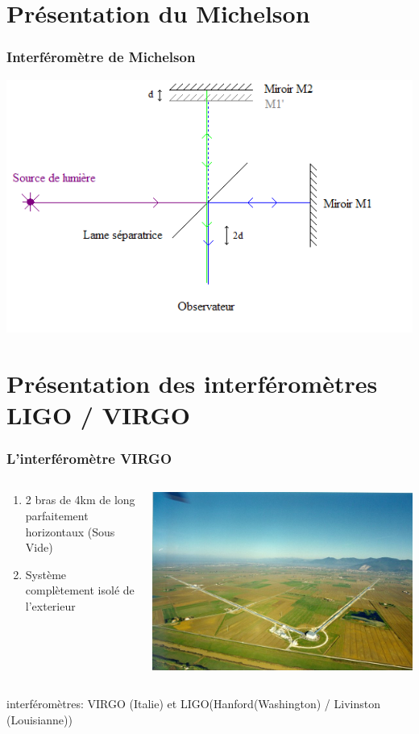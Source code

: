 \documentclass{beamer}
\begin{document}
\section{Présentation du Michelson}

\begin{frame}
	\frametitle{Interféromètre de Michelson}
	\includegraphics[scale=0.5]{Docs/interferometre_michelson.png}
\end{frame}


\section{Présentation des interféromètres LIGO / VIRGO}
\begin{frame}
	\frametitle{L'interféromètre VIRGO}
	\begin{columns}
		\begin{column}{0.5\textwidth}
			\small
			\begin{enumerate}[-]
				\item 2 bras de 4km de long parfaitement horizontaux (Sous Vide)
				\item Système complètement isolé de l'exterieur
			\end{enumerate}
		\end{column}
		\begin{column}{0.5\textwidth}
			\includegraphics[scale=.5]{Docs/virgoview.png}
		\end{column}
	\end{columns}
	 interféromètres: VIRGO (Italie) et LIGO(Hanford(Washington) / Livinston (Louisianne))
\end{frame}
\end{document}
